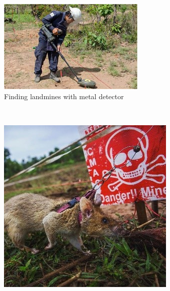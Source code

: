 \begin{figure} [H]
    \centering
    \begin{subfigure}[b]{0.28\textwidth}
        \includegraphics[width=\textwidth]{00 - Images/man_with_detector.jpg}
        \caption{Finding landmines with metal detector \cite{ManDetector2018}}
        \label{fig:man_with_detector}
    \end{subfigure}
    ~ %
    \begin{subfigure}[b]{0.28\textwidth}
        \includegraphics[width=\textwidth]{00 - Images/rat_finding_mines.jpg}

\end{subfigure}
\end{figure}
